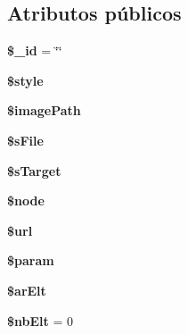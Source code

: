 \subsection*{\-Atributos públicos}
\begin{DoxyCompactItemize}
\item 
\hypertarget{classtlistemysql_a9ddf9ba93546488a287df97d2a8daadb}{{\bfseries \$\-\_\-id} = \char`\"{}\char`\"{}}\label{classtlistemysql_a9ddf9ba93546488a287df97d2a8daadb}

\item 
\hypertarget{classtlistemysql_ac5ee162a82a177093f9f141706ef63a2}{{\bfseries \$style}}\label{classtlistemysql_ac5ee162a82a177093f9f141706ef63a2}

\item 
\hypertarget{classtlistemysql_add32908fbfe4df9a2ffd1ede229220da}{{\bfseries \$image\-Path}}\label{classtlistemysql_add32908fbfe4df9a2ffd1ede229220da}

\item 
\hypertarget{classtlistemysql_a460438e1099c4aa1316fae91de2c7a26}{{\bfseries \$s\-File}}\label{classtlistemysql_a460438e1099c4aa1316fae91de2c7a26}

\item 
\hypertarget{classtlistemysql_ab0ec57d6c63919cacef728929e10d47c}{{\bfseries \$s\-Target}}\label{classtlistemysql_ab0ec57d6c63919cacef728929e10d47c}

\item 
\hypertarget{classtlistemysql_aeaf969d895757504965b1e9ec8349b47}{{\bfseries \$node}}\label{classtlistemysql_aeaf969d895757504965b1e9ec8349b47}

\item 
\hypertarget{classtlistemysql_a4a62b0b52e03ff4b956c064fc3a4f25d}{{\bfseries \$url}}\label{classtlistemysql_a4a62b0b52e03ff4b956c064fc3a4f25d}

\item 
\hypertarget{classtlistemysql_a8e145c2cd77d047f84108c3be5471c20}{{\bfseries \$param}}\label{classtlistemysql_a8e145c2cd77d047f84108c3be5471c20}

\item 
\hypertarget{classtlistemysql_a049bf18f5ffc940691d5e7d05daa8e7a}{{\bfseries \$ar\-Elt}}\label{classtlistemysql_a049bf18f5ffc940691d5e7d05daa8e7a}

\item 
\hypertarget{classtlistemysql_a6b42eb49fe2e32b077f09a93faf421dc}{{\bfseries \$nb\-Elt} = 0}\label{classtlistemysql_a6b42eb49fe2e32b077f09a93faf421dc}


\end{DoxyCompactItemize}
